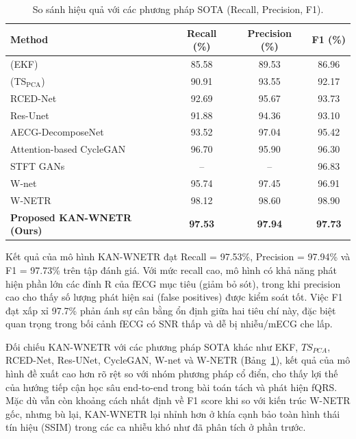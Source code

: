 \documentclass[../DoAn.tex]{subfiles}
\begin{document}
\begin{table}[htbp]
\centering
\caption{So sánh hiệu quả với các phương pháp SOTA (Recall, Precision, F1).}
\label{tab:compare_recall_precision_f1}
\setlength{\tabcolsep}{8pt}
\renewcommand{\arraystretch}{1.15}
\begin{tabular}{lccc}
\hline
\textbf{Method} & \textbf{Recall (\%)} & \textbf{Precision (\%)} & \textbf{F1 (\%)} \\
\hline
(EKF)                     & 85.58 & 89.53 & 86.96 \\
(TS$_{\mathrm{PCA}}$)     & 90.91 & 93.55 & 92.17 \\
RCED-Net                  & 92.69 & 95.67 & 93.73 \\
Res-Unet                  & 91.88 & 94.36 & 93.10 \\
AECG-DecomposeNet         & 93.52 & 97.04 & 95.42 \\
Attention-based CycleGAN  & 96.70 & 95.90 & 96.30 \\
STFT GANs                 & --    & --    & 96.83 \\
W-net                     & 95.74 & 97.45 & 96.91 \\
W-NETR           & 98.12 & 98.60 & 98.90 \\
\hline
\textbf{Proposed KAN-WNETR (Ours)}   & \textbf{97.53} & \textbf{97.94} & \textbf{97.73} \\
\hline
\end{tabular}
\end{table}

Kết quả của mô hình KAN-WNETR đạt Recall = 97.53\%, Precision = 97.94\% và F1 = 97.73\% trên tập đánh giá. Với mức recall cao, mô hình có khả năng phát hiện phần lớn các đỉnh R của fECG mục tiêu (giảm bỏ sót), trong khi precision cao cho thấy số lượng phát hiện sai (false positives) được kiểm soát tốt. Việc F1 đạt xấp xỉ 97.7\% phản ánh sự cân bằng ổn định giữa hai tiêu chí này, đặc biệt quan trọng trong bối cảnh fECG có SNR thấp và dễ bị nhiễu/mECG che lấp. 

Đối chiếu KAN-WNETR với các phương pháp SOTA khác như EKF, $TS_{PCA}$, RCED-Net, Res-UNet, CycleGAN, W-net và W-NETR (Bảng~\ref{tab:compare_recall_precision_f1}), kết quả của mô hình đề xuất cao hơn rõ rệt so với nhóm phương pháp cổ điển, cho thấy lợi thế của hướng tiếp cận học sâu end-to-end trong bài toán tách và phát hiện fQRS. Mặc dù vẫn còn khoảng cách nhất định về F1 score khi so với kiến trúc W-NETR gốc, nhưng bù lại, KAN-WNETR lại nhỉnh hơn ở khía cạnh bảo toàn hình thái tín hiệu (SSIM) trong các ca nhiễu khó như đã phân tích ở phần trước.
\end{document}
